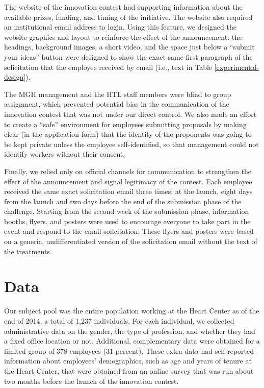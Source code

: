\documentclass[12pt, titlepage]{article}
\begin{document}
The website of the innovation contest had supporting information about
the available prizes, funding, and timing of the initiative. The website
also required an institutional email address to login. Using this
feature, we designed the website graphics and layout to reinforce the
effect of the announcement: the headings, background images, a short
video, and the space just below a ``submit your ideas'' button were
designed to show the exact same first paragraph of the solicitation that
the employee received by email (i.e., text in Table
\ref{experimental-design}).

The MGH management and the HTL staff members were blind to group
assignment, which prevented potential bias in the communication of the
innovation contest that was not under our direct control. We also made
an effort to create a ``safe'' environment for employees submitting
proposals by making clear (in the application form) that the identity of
the proponents was going to be kept private unless the employee
self-identified, so that management could not identify workers without
their consent.

Finally, we relied only on official channels for communication to
strengthen the effect of the announcement and signal legitimacy of the
contest. Each employee received the same exact solicitation email three
times: at the launch, eight days from the launch and two days before the
end of the submission phase of the challenge. Starting from the second
week of the submission phase, information booths, flyers, and posters
were used to encourage everyone to take part in the event and respond to
the email solicitation. These flyers and posters were based on a
generic, undifferentiated version of the solicitation email without the
text of the treatments.

\section{Data}\label{data}

Our subject pool was the entire population working at the Heart Center
as of the end of 2014, a total of 1,237 individuals. For each
individual, we collected administrative data on the gender, the type of
profession, and whether they had a fixed office location or not.
Additional, complementary data were obtained for a limited group of 378
employees (31 percent). These extra data had self-reported information
about employees' demographics, such as age and years of tenure at the
Heart Center, that were obtained from an online survey that was run
about two months before the launch of the innovation contest.
\end{document}
